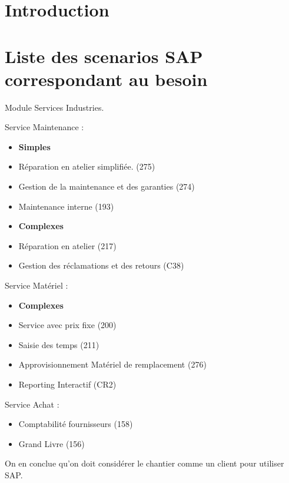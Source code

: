 \documentclass[a4paper]{article}
\begin{document}
\maketitle

\begin{abstract}
\end{abstract}

\section{Introduction}

\section{Liste des scenarios SAP correspondant au besoin}

Module Services Industries.

Service Maintenance : \\

\begin{itemize}
    \item \textbf{Simples}
    \item Réparation en atelier simplifiée. (275)
    \item Gestion de la maintenance et des garanties (274)
    \item Maintenance interne (193)
    \item \textbf{Complexes}
    \item Réparation en atelier (217)
    \item Gestion des réclamations et des retours (C38)
\end{itemize}

Service Matériel : \\

\begin{itemize}
    \item \textbf{Complexes}    
    \item Service avec prix fixe (200)
    \item Saisie des temps (211)
    \item Approvisionnement Matériel de remplacement (276)
    \item Reporting Interactif (CR2)
\end{itemize}

Service Achat : \\

\begin{itemize}
    \item Comptabilité fournisseurs (158)
    \item Grand Livre (156)
\end{itemize}

On en conclue qu'on doit considérer le chantier comme un client pour utiliser 
SAP.

\subsection{}
\end{document}
